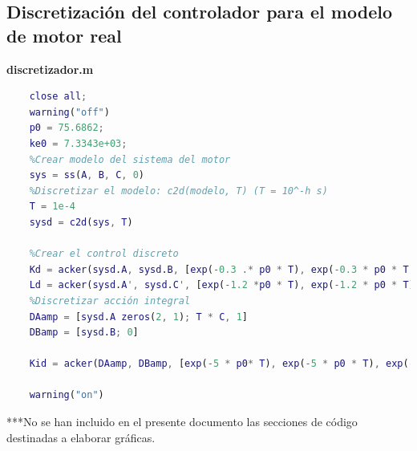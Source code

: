 \documentclass[a4paper, 12pt]{article}
\begin{document}
\subsection*{Discretización del controlador para el modelo de motor real}
\textbf{discretizador.m}
\begin{lstlisting}[language = Matlab]
	%Es necesario haber ejecutado antes realimentador.m (Práctica 4)
	close all;
	warning("off")
	p0 = 75.6862;
	ke0 = 7.3343e+03;
	%Crear modelo del sistema del motor
	sys = ss(A, B, C, 0)
	%Discretizar el modelo: c2d(modelo, T) (T = 10^-h s)
	T = 1e-4
	sysd = c2d(sys, T)
	
	%Crear el control discreto
	Kd = acker(sysd.A, sysd.B, [exp(-0.3 .* p0 * T), exp(-0.3 * p0 * T)])
	Ld = acker(sysd.A', sysd.C', [exp(-1.2 *p0 * T), exp(-1.2 * p0 * T)] )'
	%Discretizar acción integral
	DAamp = [sysd.A zeros(2, 1); T * C, 1] 
	DBamp = [sysd.B; 0]
	
	Kid = acker(DAamp, DBamp, [exp(-5 * p0* T), exp(-5 * p0 * T), exp(-7*p0*T)])
	
	warning("on")
\end{lstlisting}

***No se han incluido en el presente documento las secciones de código destinadas a elaborar gráficas.  
\end{document}
